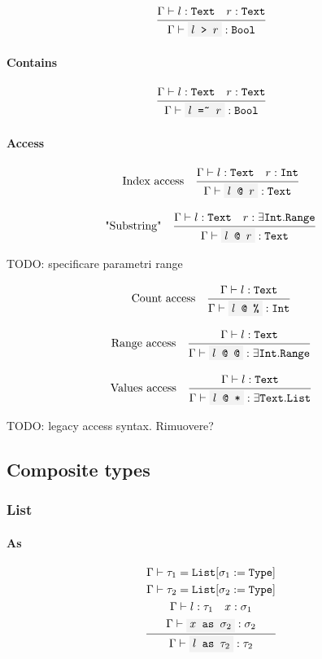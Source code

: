 \documentclass[11pt]{report}
\newcommand{\infrule}[3][gathered]{\frac{\begin{#1}#2\end{#1}}{\begin{gathered}#3\end{gathered}}}
\newcommand{\then}{\vdash}
\newcommand{\code}[1]{\texttt{\colorbox{gray!10}{#1}}}
\newcommand{\Type}{\texttt{Type}}
\newcommand{\Bool}{\texttt{Bool}}
\newcommand{\Text}{\texttt{Text}}
\newcommand{\Int}{\texttt{Int}}
\newcommand{\List}{\texttt{List}}
\newcommand{\Range}{\texttt{Range}}
\newcommand{\Env}{\Gamma}
\theoremstyle{definition}
\newcommand{\comment}[1]{
	\parbox{0.9\linewidth}{\color{black!30}\small\sffamily #1}
}
\begin{document}
\[
	\infrule{
		\Env\then l:\Text \quad r:\Text
	}{
		\Env\then \code{$l$ > $r$}: \Bool
	}
\]

\paragraph{Contains}

\[
	\infrule{
		\Env\then l:\Text \quad r:\Text
	}{
		\Env\then \code{$l$ =\~{} $r$}: \Bool
	}
\]

\paragraph{Access}

\[
	\text{Index access}\quad
	\infrule{
		\Env\then l:\Text \quad r:\Int
	}{
		\Env\then \code{$l$ @ $r$}: \Text
	}
\]

\[
	\text{"Substring"}\quad
	\infrule{
		\Env\then l:\Text \quad r:\exists\Int.\Range
	}{
		\Env\then \code{$l$ @ $r$}: \Text
	}
\]

\comment{TODO: specificare parametri range}

\[
	\text{Count access}\quad
	\infrule{
		\Env\then l:\Text
	}{
		\Env\then \code{$l$ @ \%}: \Int
	}
\]

\[
	\text{Range access}\quad
	\infrule{
		\Env\then l:\Text
	}{
		\Env\then \code{$l$ @ @}: \exists\Int.\Range
	}
\]

\[
	\text{Values access}\quad
	\infrule{
		\Env\then l:\Text
	}{
		\Env\then \code{$l$ @ *}: \exists\Text.\List
	}
\]

\comment{TODO: legacy access syntax. Rimuovere?}

\newpage

\subsection{Composite types}

\subsubsection{List}

\paragraph{As}

\[
	\infrule{
		\Env\then \tau_1 = \List[\sigma_1 := \Type] \\*
		\Env\then \tau_2 = \List[\sigma_2 := \Type] \\*
		\Env\then l:\tau_1 \quad x:\sigma_1 \\*
		\Env\then \code{$x$ as $\sigma_2$} : \sigma_2
	}{
		\Env\then \code{$l$ as $\tau_2$} : \tau_2
	}
\]
\end{document}
